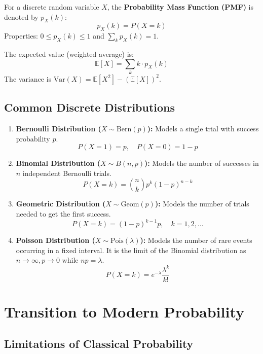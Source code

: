 \documentclass[oneside]{book}
\begin{document}
\begin{definition}
For a discrete random variable $X$, the \textbf{Probability Mass Function (PMF)} is denoted by $p_X(k)$:
\[ p_X(k) = P(X = k) \]
Properties: $0 \le p_X(k) \le 1$ and $\sum_k p_X(k) = 1$.
\end{definition}

\begin{definition}
The expected value (weighted average) is:
\[ \mathbb{E}[X] = \sum_{k} k \cdot p_X(k) \]
The variance is $\text{Var}(X) = \mathbb{E}[X^2] - (\mathbb{E}[X])^2$.
\end{definition}

\subsection{Common Discrete Distributions}

\begin{enumerate}
    \item \textbf{Bernoulli Distribution ($X \sim \text{Bern}(p)$):}
    Models a single trial with success probability $p$.
    \[ P(X=1) = p, \quad P(X=0) = 1-p \]
    
    \item \textbf{Binomial Distribution ($X \sim B(n, p)$):}
    Models the number of successes in $n$ independent Bernoulli trials.
    \[ P(X = k) = \binom{n}{k} p^k (1-p)^{n-k} \]
    
    \item \textbf{Geometric Distribution ($X \sim \text{Geom}(p)$):}
    Models the number of trials needed to get the first success.
    \[ P(X = k) = (1-p)^{k-1}p, \quad k=1, 2, \dots \]
    
    \item \textbf{Poisson Distribution ($X \sim \text{Pois}(\lambda)$):}
    Models the number of rare events occurring in a fixed interval. It is the limit of the Binomial distribution as $n \to \infty, p \to 0$ while $np = \lambda$.
    \[ P(X = k) = e^{-\lambda} \frac{\lambda^k}{k!} \]
\end{enumerate}

\section{Transition to Modern Probability}

\subsection{Limitations of Classical Probability}
\end{document}
